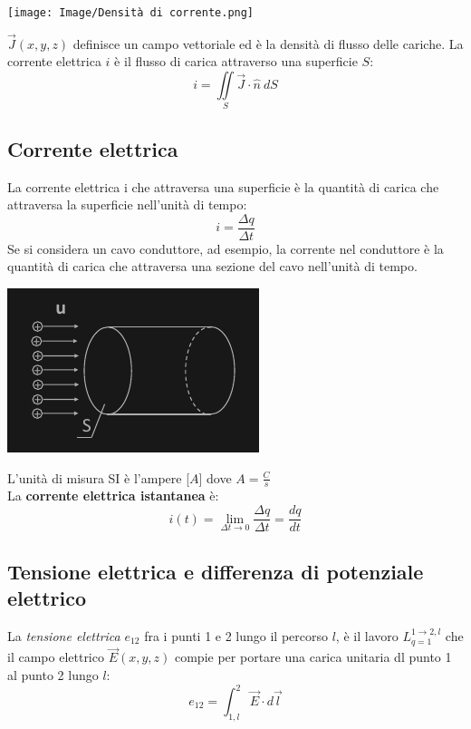 \documentclass{article}
\begin{document}
\begin{center}
    \texttt{[image: Image/Densità di corrente.png]}
\end{center}

$\vec J(x,y,z)$ definisce un campo vettoriale ed è la densità di flusso delle
cariche. La corrente elettrica $i$ è il flusso di carica attraverso una
superficie $S$:
\[
    i = \iint\limits_S \vec J \cdot \hat n \ dS
\]




\subsection{Corrente elettrica}
La corrente elettrica i che attraversa una superficie è la quantità di carica
che attraversa la superficie nell’unità di tempo:
\[
     i = \frac{\Delta q}{\Delta t} 
\]
Se si considera un cavo conduttore, ad esempio, la corrente nel conduttore è la
quantità di carica che attraversa una sezione del cavo nell'unità di tempo.

\begin{center}
    \includegraphics[scale=0.5]{Image/Corrente conduttore.png}
\end{center}

L'unità di misura SI è l'ampere [$A$] dove $A = \frac{C}{s}$
\vspace*{0.1cm}\\
La \textbf{corrente elettrica istantanea} è:
\[
    i(t) = \lim_{\Delta t \rightarrow 0} \frac{\Delta q}{\Delta t} = \frac{dq}{dt}
\]



\subsection{Tensione elettrica e differenza di potenziale elettrico}
La \textit{tensione elettrica} $e_{12}$ fra i punti 1 e 2 lungo il
percorso $l$, è il lavoro $L^{1\rightarrow 2,l}_{q=1}$ che il campo elettrico
$\vec E(x,y,z)$ compie per portare una carica unitaria dl
punto 1 al punto 2 lungo $l$:
\[
    e_{12} = \int_{1,l}^2 \vec E \cdot d \vec l
\]
\end{document}
